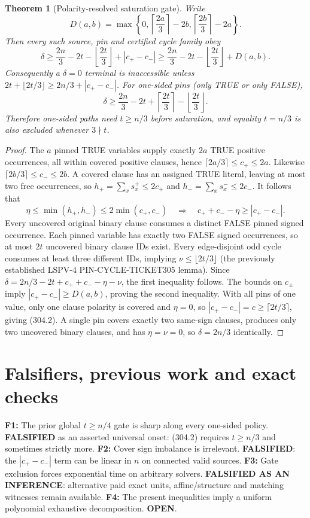 \documentclass[11pt]{article}
\newtheorem{theorem}{Theorem}
\begin{document}
\begin{theorem}[Polarity-resolved saturation gate]
Write
\[
D(a,b)=\max\left\{0,\left\lceil\frac{2a}{3}\right\rceil-2b,
\left\lceil\frac{2b}{3}\right\rceil-2a\right\}.
\]
Then every such source, pin and certified cycle family obey
\[
\boxed{\quad
\delta\ge\frac{2n}{3}-2t-\left\lfloor\frac{2t}{3}\right\rfloor
+|c_+-c_-|
\ge\frac{2n}{3}-2t-\left\lfloor\frac{2t}{3}\right\rfloor+D(a,b).
\quad}
\tag{304.1}
\]
Consequently a $\delta=0$ terminal is inaccessible unless
$2t+\lfloor2t/3\rfloor\ge2n/3+|c_+-c_-|$.
For one-sided pins (only TRUE or only FALSE),
\[
\boxed{\delta\ge\frac{2n}{3}-2t+
\left\lceil\frac{2t}{3}\right\rceil-
\left\lfloor\frac{2t}{3}\right\rfloor.}
\tag{304.2}
\]
Therefore one-sided paths need $t\ge n/3$ before saturation, and equality $t=n/3$ is also excluded whenever $3\nmid t$.
\end{theorem}
\begin{proof}
The $a$ pinned TRUE variables supply exactly $2a$ TRUE positive occurrences, all within covered positive clauses, hence
$\lceil2a/3\rceil\le c_+\le2a$. Likewise
$\lceil2b/3\rceil\le c_-\le2b$.
A covered clause has an assigned TRUE literal, leaving at most two free occurrences, so $h_+=\sum_xs_x^+\le2c_+$ and $h_-=\sum_xs_x^-\le2c_-$. It follows that
\[
\eta\le\min(h_+,h_-)\le2\min(c_+,c_-)
\quad\Longrightarrow\quad c_++c_--\eta\ge|c_+-c_-|.
\]
Every uncovered original binary clause consumes a distinct FALSE pinned signed occurrence. Each pinned variable has exactly two FALSE signed occurrences, so at most $2t$ uncovered binary clause IDs exist. Every edge-disjoint odd cycle consumes at least three different IDs, implying $\nu\le\lfloor2t/3\rfloor$ (the previously established LSPV-4 PIN-CYCLE-TICKET305 lemma). Since
$\delta=2n/3-2t+c_++c_--\eta-\nu$, the first inequality follows. The bounds on $c_\pm$ imply $|c_+-c_-|\ge D(a,b)$, proving the second inequality. With all pins of one value, only one clause polarity is covered and $\eta=0$, so $|c_+-c_-|=c\ge\lceil2t/3\rceil$, giving (304.2). A single pin covers exactly two same-sign clauses, produces only two uncovered binary clauses, and has $\eta=\nu=0$, so $\delta=2n/3$ identically.
\end{proof}

\section{Falsifiers, previous work and exact checks}
\noindent\textbf{F1:} The prior global $t\ge n/4$ gate is sharp along every one-sided policy. \textbf{FALSIFIED} as an asserted universal onset: (304.2) requires $t\ge n/3$ and sometimes strictly more. \textbf{F2:} Cover sign imbalance is irrelevant. \textbf{FALSIFIED}: the $|c_+-c_-|$ term can be linear in $n$ on connected valid sources. \textbf{F3:} Gate exclusion forces exponential time on arbitrary solvers. \textbf{FALSIFIED AS AN INFERENCE}: alternative paid exact units, affine/structure and matching witnesses remain available. \textbf{F4:} The present inequalities imply a uniform polynomial exhaustive decomposition. \textbf{OPEN}.
\end{document}

